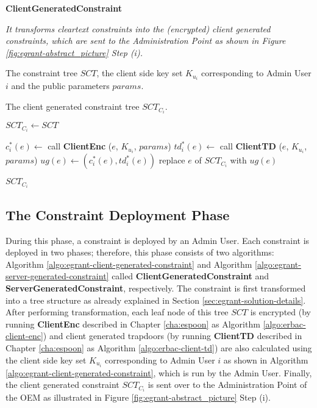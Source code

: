 \documentclass[epsfig,a4paper,11pt,titlepage]{book}
\numberwithin{algorithm}{chapter}
\newcommand{\algofontsize}{\fontsize{11}{12}\selectfont}
\begin{document}
\begin{algorithm} [htp]
{\algofontsize
\caption{\textbf{ClientGeneratedConstraint}}

\label{algo:egrant-client-generated-constraint}

\begin{algorithmic}[1]

\INPUT \emph{It transforms cleartext constraints into the (encrypted) client generated constraints, which are sent to the Administration Point as shown in Figure \ref{fig:egrant-abstract_picture} Step (i).}

\Require The constraint tree $SCT$, the client side key set $K_{u_i}$ corresponding to Admin User $i$ and the public parameters $params$.

\Ensure The client generated constraint tree $SCT_{C_i}$.

\medskip

\State $SCT_{C_i} \leftarrow SCT$


	\State $c^*_i (e) \leftarrow$ call \textbf{ClientEnc} ($e$, $K_{u_i}$, $params$)
	\State $td^*_i (e) \leftarrow$ call \textbf{ClientTD} ($e$, $K_{u_i}$, $params$)
	\State $ug(e) \leftarrow (c^*_i (e), td^*_i (e))$
	\State replace $e$ of $SCT_{C_i}$ with $ug(e)$

\EndFor

\Return $SCT_{C_i}$

\end{algorithmic}
}
\end{algorithm}


\subsection{The Constraint Deployment Phase}
During this phase, a constraint is deployed by an Admin User. Each constraint is deployed in two phases; therefore, this phase consists of two algorithms: Algorithm \ref{algo:egrant-client-generated-constraint} and Algorithm \ref{algo:egrant-server-generated-constraint} called \textbf{ClientGeneratedConstraint} and \textbf{ServerGeneratedConstraint}, respectively. The constraint is first transformed into a tree structure as already explained in Section \ref{sec:egrant-solution-details}. After performing transformation, each leaf node of this tree $SCT$ is encrypted (by running \textbf{ClientEnc} described in Chapter \ref{cha:espoon} as Algorithm \ref{algo:erbac-client-enc}) and client generated trapdoors (by running \textbf{ClientTD} described in Chapter \ref{cha:espoon} as Algorithm \ref{algo:erbac-client-td}) are also calculated using the client side key set $K_{u_i}$ corresponding to Admin User $i$ as shown in Algorithm \ref{algo:egrant-client-generated-constraint}, which is run by the Admin User. Finally, the client generated constraint $SCT_{C_i}$ is sent over to the Administration Point of the \gls{OEM} as illustrated in Figure \ref{fig:egrant-abstract_picture} Step (i).
\end{document}
